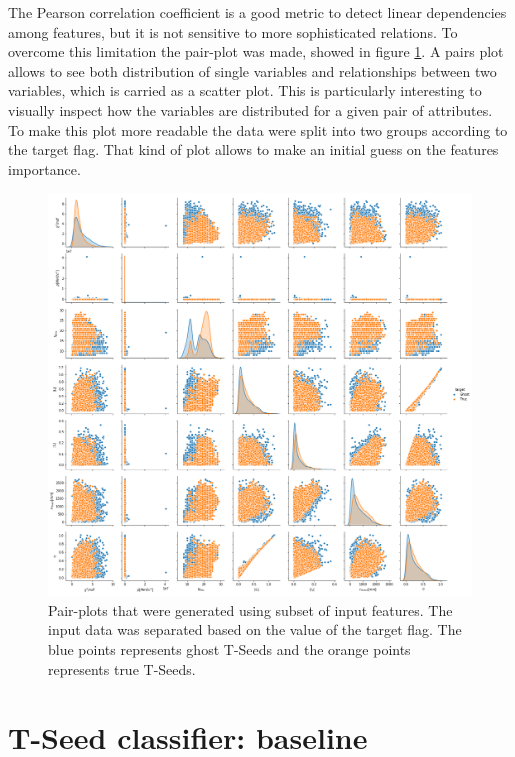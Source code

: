     
The Pearson  correlation coefficient is a good metric to detect linear dependencies among features, but it is not sensitive to more sophisticated relations. To overcome this limitation the pair-plot was made, showed in figure \ref{fig:Pair plot}. A pairs plot allows to see both distribution of single variables and relationships between two variables, which is carried as a scatter plot. This is particularly interesting to visually inspect how the variables are distributed for a given pair of attributes. To make this plot more readable the data were split into two groups according to the target flag. That kind of plot allows to make an initial guess on the features importance. 

\begin{figure}[!h]
\centering
\hspace*{-2cm}\includegraphics[width=1.3\textwidth]{figures/pair_plot.png}
\caption{Pair-plots that were generated using subset of input features. The input data was separated based on the value of the target flag. The blue points represents ghost T-Seeds and the orange points represents true T-Seeds. }
\label{fig:Pair plot}
\end{figure}

\section{T-Seed classifier: baseline}

